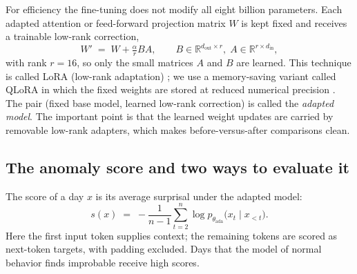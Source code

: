 \documentclass[10pt]{article} %
\begin{document}
For efficiency the fine-tuning does not modify all eight billion
parameters. Each adapted attention or feed-forward projection matrix $W$ is kept fixed and
receives a trainable low-rank correction,
\begin{equation}
W' \;=\; W + \tfrac{\alpha}{r} BA, \qquad
B \in \mathbb{R}^{d_{\mathrm{out}} \times r},\;
A \in \mathbb{R}^{r \times d_{\mathrm{in}}},
\end{equation}
with rank $r = 16$, so only the small matrices $A$ and $B$ are learned.
This technique is called LoRA (low-rank adaptation) \citep{hu2022lora}; we use a
memory-saving variant called QLoRA in which the fixed weights are
stored at reduced numerical precision \citep{dettmers2023qlora}. The pair (fixed base model,
learned low-rank correction) is called the \emph{adapted model}. The
important point is that the learned weight updates are carried by
removable low-rank adapters, which makes before-versus-after
comparisons clean.

\subsection{The anomaly score and two ways to evaluate it}
\label{sec:protocols}

The score of a day $x$ is its average surprisal under the adapted
model:
\begin{equation}
s(x) \;=\; -\frac{1}{n-1}\sum_{t=2}^{n} \log
p_{\theta_{\mathrm{ada}}}\bigl(x_t \mid x_{<t}\bigr).
\end{equation}
Here the first input token supplies context; the remaining tokens are
scored as next-token targets, with padding excluded. Days that the model
of normal behavior finds improbable receive high scores.
\end{document}

